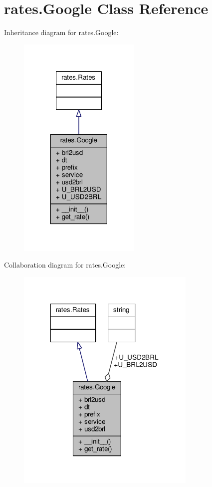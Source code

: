 \hypertarget{classrates_1_1_google}{}\section{rates.\+Google Class Reference}
\label{classrates_1_1_google}


Inheritance diagram for rates.\+Google\+:
\nopagebreak
\begin{figure}[H]
\begin{center}
\leavevmode
\includegraphics[width=165pt]{classrates_1_1_google__inherit__graph}
\end{center}
\end{figure}


Collaboration diagram for rates.\+Google\+:
\nopagebreak
\begin{figure}[H]
\begin{center}
\leavevmode
\includegraphics[width=243pt]{classrates_1_1_google__coll__graph}
\end{center}
\end{figure}
